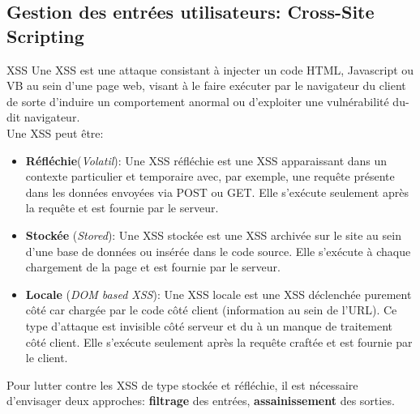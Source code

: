 \documentclass[twoside,a4paper,12pt,titlepage]{book}
\begin{document}
\subsection{Gestion des entrées utilisateurs: Cross-Site Scripting}
\begin{Define}{XSS}
Une \gls{XSS} est une attaque consistant à injecter un code HTML, Javascript ou VB au sein d'une page web, visant à le faire exécuter par le navigateur du client de sorte d'induire un comportement anormal ou d'exploiter une vulnérabilité du-dit navigateur.\\Une XSS peut être:\begin{itemize}
\item \textbf{Réfléchie}(\textit{Volatil}): Une XSS réfléchie est une XSS apparaissant dans un contexte particulier et temporaire avec, par exemple, une requête présente dans les données envoyées via POST ou GET. Elle s'exécute seulement après la requête et est fournie par le serveur.
\item \textbf{Stockée} (\textit{Stored}): Une XSS stockée est une XSS archivée sur le site au sein d'une base de données ou insérée dans le code source. Elle s'exécute à chaque chargement de la page et est fournie par le serveur.
\item \textbf{Locale} (\textit{DOM based XSS}): Une XSS locale est une XSS déclenchée purement côté car chargée par le code côté client (information au sein de l'URL). Ce type d'attaque est invisible côté serveur et du à un manque de traitement côté client. Elle s'exécute seulement après la requête craftée et est fournie par le client.
\end{itemize}
\end{Define}

Pour lutter contre les XSS de type stockée et réfléchie, il est nécessaire d'envisager deux approches: \textbf{filtrage} des entrées, \textbf{assainissement} des sorties.
\end{document}
